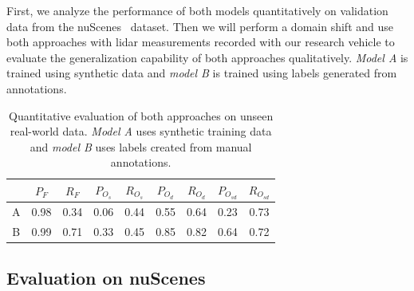 \documentclass[conference]{IEEEtran}
\begin{document}
First, we analyze the performance of both models quantitatively on validation data from the nuScenes~\cite{Caesar.2020} dataset. Then we will perform a domain shift and use both approaches with lidar measurements recorded with our research vehicle to evaluate the generalization capability of both approaches qualitatively. \textit{Model A} is trained using synthetic data and \textit{model B} is trained using labels generated from annotations.

\begin{table}
    \centering
    \begin{tabular}{|c | c c | c c | c c | c c|}
     \hline
      & $P_F$ & $R_F$ & $P_{O_s}$ & $R_{O_s}$ & $P_{O_d}$ & $R_{O_d}$ & $P_{O_{sd}}$ & $R_{O_{sd}}$ \\[1ex]
     \hline\hline
     A & 0.98 & 0.34 & 0.06 & 0.44 & 0.55 & 0.64 & 0.23 & 0.73 \\ 
     \hline
     B & 0.99 & 0.71 & 0.33 & 0.45 & 0.85 & 0.82 & 0.64 & 0.72 \\ 
     \hline
    \end{tabular}\caption{Quantitative evaluation of both approaches on unseen real-world data. \textit{Model A} uses synthetic training data and \textit{model B} uses labels created from manual annotations.}\label{tab:results}
\end{table}

\subsection{Evaluation on nuScenes}\label{sec:eval-nuscenes}
\end{document}
